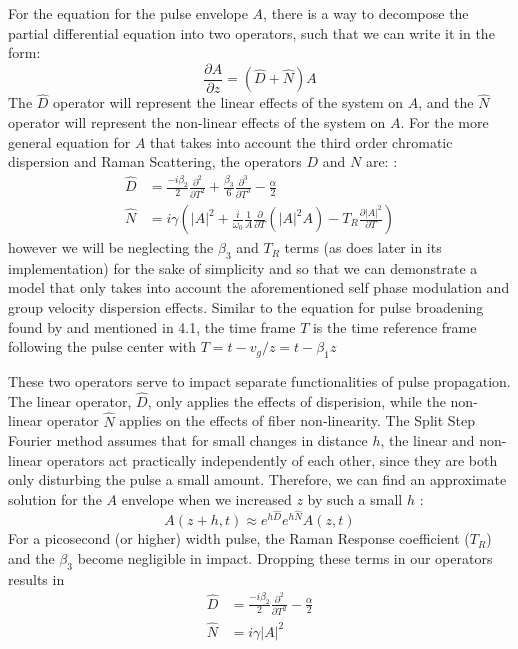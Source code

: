 \documentclass[10pt, a4paper, twocolumn]{article} %
\begin{document}
For the equation for the pulse envelope $A$, there is a way to decompose the partial differential equation into two operators, such that we can write it in the form:
$$\frac{\partial A}{\partial z} = (\hat{D} + \hat{N})A$$
The $\hat{D}$ operator will represent the linear effects of the system on $A$, and the $\hat{N}$ operator will represent the non-linear effects of the system on $A$. For the more general equation for $A$ that takes into account the third order chromatic dispersion and Raman Scattering, the operators $D$ and $N$ are: \cite{Munaweera}:
\begin{align*}
    \hat{D} &= \frac{-i\beta_2}{2} \frac{\partial^2}{\partial T^2} + \frac{\beta_3}{6}\frac{\partial^3}{\partial T^3} - \frac{\alpha}{2}\\
    \hat{N} &= i\gamma \left(|A|^2 + \frac{i}{\omega_0} \frac{1}{A} \frac{\partial}{\partial T} (|A|^2A) - T_R \frac{\partial |A|^2}{\partial T}\right)
\end{align*}
however we will be neglecting the $\beta_3$ and $T_R$ terms (as \cite{Munaweera} does later in its implementation) for the sake of simplicity and so that we can demonstrate a model that only takes into account the aforementioned self phase modulation and group velocity dispersion effects. Similar to the equation for pulse broadening found by \cite{AgrawalChap3} and mentioned in 4.1, the time frame $T$ is the time reference frame following the pulse center with $T = t - v_g/z = t - \beta_1 z$

These two operators serve to impact separate functionalities of pulse propagation. The linear operator, $\hat{D}$, only applies the effects of disperision, while the non-linear operator $\hat{N}$ applies on the effects of fiber non-linearity. The Split Step Fourier method assumes that for small changes in distance $h$, the linear and non-linear operators act practically independently of each other, since they are both only disturbing the pulse a small amount. Therefore, we can find an approximate solution for the $A$ envelope when we increased $z$ by such a small $h$ \cite{Munaweera}:
$$A(z + h, t) \approx e^{h \hat{D}} e^{h \hat{N}} A(z, t)$$
For a picosecond (or higher) width pulse, the Raman Response coefficient ($T_R$) and the $\beta_3$ become negligible in impact. Dropping these terms in our operators results in
\begin{align*}
    \hat{D} &= \frac{-i\beta_2}{2} \frac{\partial^2}{\partial T^2} - \frac{\alpha}{2}\\
    \hat{N} &= i\gamma |A|^2
\end{align*}
\end{document}
